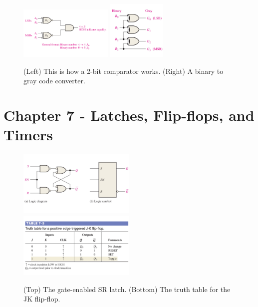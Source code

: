 \documentclass[10pt]{article}
\begin{document}
\begin{figure}[hb]
\centering
\includegraphics[width=0.4\textwidth]{figures/2bitcomparator.pdf} \hspace{0.25cm}
\includegraphics[width=0.25\textwidth]{figures/binaryGray.pdf}
\caption{\label{fig:2bit} (Left) This is how a 2-bit comparator works. (Right) A binary to gray code converter.}
\end{figure}

\clearpage

\section{Chapter 7 - Latches, Flip-flops, and Timers}
\label{sec:latch}

\begin{figure}[ht]
\centering
\includegraphics[width=0.5\textwidth]{figures/enSRLatch.pdf} \hspace{0.5cm}
\includegraphics[width=0.5\textwidth]{figures/jkFlopTT.pdf}
\caption{\label{fig:latch} (Top) The gate-enabled SR latch. (Bottom) The truth table for the JK flip-flop.}
\end{figure}
\end{document}
